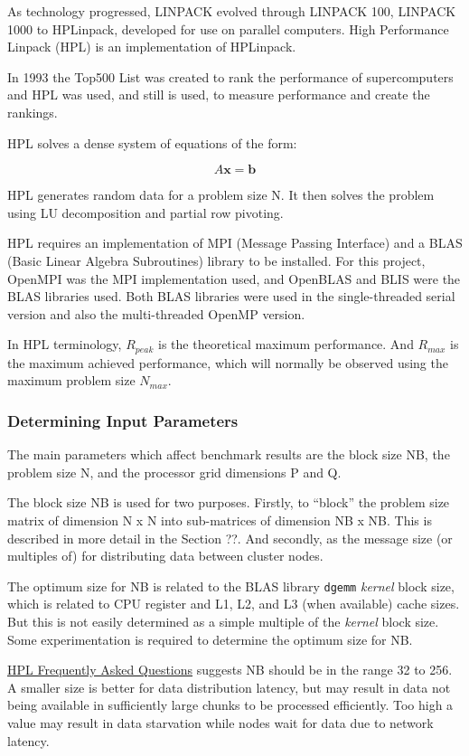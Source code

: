 As technology progressed, LINPACK evolved through LINPACK 100, LINPACK 1000 to HPLinpack, developed for use on parallel computers. High Performance Linpack (HPL) is an implementation of HPLinpack.

In 1993 the Top500 List was created to rank the performance of supercomputers and HPL was used, and still is used, to measure performance and create the rankings.

HPL solves a dense system of equations of the form:

\[A\mathbf{x}=\mathbf{b}\]

HPL generates random data for a problem size N. It then solves the problem using LU decomposition and partial row pivoting.

HPL requires an implementation of MPI (Message Passing Interface) and a BLAS (Basic Linear Algebra Subroutines) library to be installed. For this project, OpenMPI was the MPI implementation used, and OpenBLAS and BLIS were the BLAS libraries used. Both BLAS libraries were used in the single-threaded serial version and also the multi-threaded OpenMP version.

In HPL terminology, $R_{peak}$ is the theoretical maximum performance. And $R_{max}$ is the maximum achieved performance, which will normally be observed using the maximum problem size $N_{max}$.


%
%
\subsubsection{Determining Input Parameters}

The main parameters which affect benchmark results are the block size NB, the problem size N, and the processor grid dimensions P and Q.

The block size NB is used for two purposes. Firstly, to ``block'' the problem size matrix of dimension N x N into sub-matrices of dimension NB x NB. This is described in more detail in the Section ??. And secondly, as the message size (or multiples of) for distributing data between cluster nodes.

The optimum size for NB is related to the BLAS library \verb|dgemm| \emph{kernel} block size, which is related to CPU register and L1, L2, and L3 (when available) cache sizes. But this is not easily determined as a simple multiple of the \emph{kernel} block size. Some experimentation is required to determine the optimum size for NB.

\href{https://www.netlib.org/benchmark/hpl/faqs.html}{HPL Frequently Asked Questions} suggests NB should be in the range 32 to 256. A smaller size is better for data distribution latency, but may result in data not being available in sufficiently large chunks to be processed efficiently. Too high a value may result in data starvation while nodes wait for data due to network latency.

